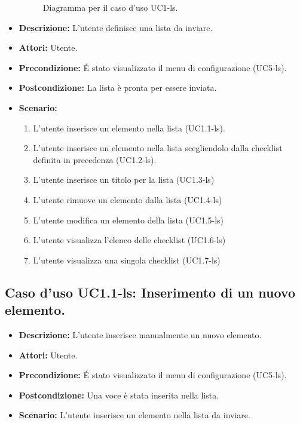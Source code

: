 \begin{itemize}
\begin{figure}[ht]
   \caption{Diagramma per il caso d'uso UC1-ls.}
\end{figure}
\FloatBarrier
\item[]\textbf{Descrizione:} L'utente definisce una lista da inviare.
\item[]\textbf{Attori:} Utente. 
\item[]\textbf{Precondizione:} \'E stato visualizzato il menu di configurazione (UC5-ls). 
\item[]\textbf{Postcondizione:} La lista è pronta per essere inviata. 
\item[]\textbf{Scenario:}
\begin{enumerate}



\item L'utente inserisce un elemento nella lista (UC1.1-ls).

\item L'utente inserisce un elemento nella lista scegliendolo dalla checklist definita in precedenza (UC1.2-ls).
\item L'utente inserisce un titolo per la lista (UC1.3-ls)
\item L'utente rimuove un elemento dalla lista (UC1.4-ls)
\item L'utente modifica un elemento della lista (UC1.5-ls)
\item L'utente visualizza l'elenco delle checklist (UC1.6-ls)
\item L'utente visualizza una singola checklist (UC1.7-ls)

\end{enumerate} 
\end{itemize}

\subsection{Caso d'uso UC1.1-ls: Inserimento di un nuovo elemento.}
\begin{itemize}
\item[]\textbf{Descrizione:} L'utente inserisce manualmente un nuovo elemento.
\item[]\textbf{Attori:} Utente. 
\item[]\textbf{Precondizione:} \'E stato visualizzato il menu di configurazione (UC5-ls). 
\item[]\textbf{Postcondizione:} Una voce è stata inserita nella lista. 
\item[]\textbf{Scenario:}
L'utente inserisce un elemento nella lista da inviare. 
\end{itemize}

